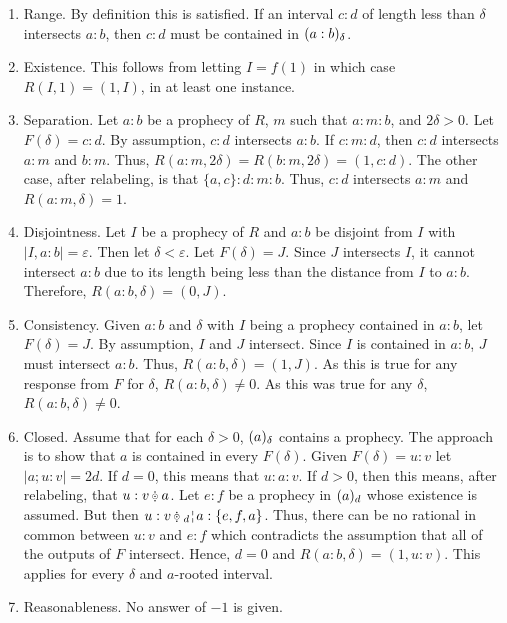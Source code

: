 \documentclass[12pt]{article}
\begin{document}
\begin{enumerate}
    \item Range. By definition this is satisfied.  If an interval $c:d$ of length less than $\delta$ intersects $a:b$, then $c:d$ must be contained in $\halo{a:b}$.
    
    \item Existence. This follows from letting $I=f(1)$ in which case $R(I, 1) = (1, I)$, in at least one instance. 
    
    \item Separation. Let $a:b$ be a prophecy of $R$, $m$ such that $a:m:b$, and $2\delta > 0$. Let $F(\delta)= c:d$. By assumption, $c:d$ intersects $a:b$. If $c:m:d$, then $c:d$ intersects $a:m$ and $b:m$. Thus, $R(a:m, 2 \delta) = R(b:m, 2\delta) = (1, c:d)$. The other case, after relabeling, is that $\{a, c\}:d:m:b$. Thus, $c:d$ intersects $a:m$ and $R(a:m, \delta) = 1$. 
    
    \item Disjointness. Let $I$ be a prophecy of $R$ and $a:b$ be disjoint from $I$ with $|I, a:b| = \varepsilon$. Then let $\delta < \varepsilon$. Let $F(\delta) = J$. Since $J$ intersects $I$, it cannot intersect $a:b$ due to its length being less than the distance from $I$ to $a:b$. Therefore, $R(a:b, \delta) = (0, J)$. 
    
    \item Consistency. Given $a:b$ and $\delta$ with $I$ being a prophecy contained in $a:b$, let $F(\delta)= J$. By assumption, $I$ and $J$ intersect. Since $I$ is contained in $a:b$, $J$ must intersect $a:b$. Thus, $R(a:b, \delta) = (1, J)$. As this is true for any response from $F$ for $\delta$, $R(a:b, \delta) \neq 0$. As this was true for any $\delta$, $R(a:b, \delta) \neq 0$. 
    
    \item Closed. Assume that for each $\delta > 0$, $\halo{a}$ contains a prophecy. The approach is to show that $a$ is contained in every $F(\delta)$. Given $F(\delta) = u:v$ let  $|a; u:v| = 2d$. If $d = 0$, this means that $u:a:v$. If $ d > 0$, then this means, after relabeling, that $u:v\betneq a$. Let $e:f$ be a prophecy in $\halo[d]{a}$ whose existence is assumed. But then $u:v \betneq \fuzbleft[d]{a} : \{e, f, a\}$. Thus, there can be no rational in common between $u:v$ and $e:f$ which contradicts the assumption that all of the outputs of $F$ intersect. Hence, $d =0$ and $R(a:b, \delta) = (1, u:v)$. This applies for every $\delta$ and $a$-rooted interval. 
    
    \item Reasonableness. No answer of $-1$ is given. 
\end{enumerate}
\end{document}
